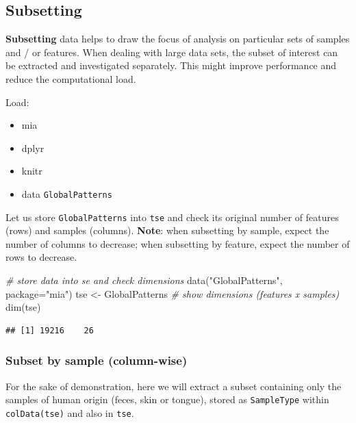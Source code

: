 \documentclass[
]{book}
\newenvironment{Shaded}{\begin{snugshade}}{\end{snugshade}}
\newcommand{\AttributeTok}[1]{\textcolor[rgb]{0.77,0.63,0.00}{#1}}
\newcommand{\CommentTok}[1]{\textcolor[rgb]{0.56,0.35,0.01}{\textit{#1}}}
\newcommand{\FunctionTok}[1]{\textcolor[rgb]{0.00,0.00,0.00}{#1}}
\newcommand{\NormalTok}[1]{#1}
\newcommand{\OtherTok}[1]{\textcolor[rgb]{0.56,0.35,0.01}{#1}}
\newcommand{\StringTok}[1]{\textcolor[rgb]{0.31,0.60,0.02}{#1}}
\providecommand{\tightlist}{%
  \setlength{\itemsep}{0pt}\setlength{\parskip}{0pt}}
\begin{document}
\hypertarget{subsetting}{%
\subsection{Subsetting}\label{subsetting}}

\textbf{Subsetting} data helps to draw the focus of analysis on particular
sets of samples and / or features. When dealing with large data
sets, the subset of interest can be extracted and investigated
separately. This might improve performance and reduce the
computational load.

Load:

\begin{itemize}
\tightlist
\item
  mia
\item
  dplyr
\item
  knitr
\item
  data \texttt{GlobalPatterns}
\end{itemize}

Let us store \texttt{GlobalPatterns} into \texttt{tse} and check its original number of features (rows) and samples (columns). \textbf{Note}: when subsetting by sample, expect the number of columns to decrease; when subsetting by feature, expect the number of rows to decrease.

\begin{Shaded}
\begin{Highlighting}[]
\CommentTok{\# store data into se and check dimensions}
\FunctionTok{data}\NormalTok{(}\StringTok{"GlobalPatterns"}\NormalTok{, }\AttributeTok{package=}\StringTok{"mia"}\NormalTok{)}
\NormalTok{tse }\OtherTok{\textless{}{-}}\NormalTok{ GlobalPatterns}
\CommentTok{\# show dimensions (features x samples)}
\FunctionTok{dim}\NormalTok{(tse) }
\end{Highlighting}
\end{Shaded}

\begin{verbatim}
## [1] 19216    26
\end{verbatim}

\hypertarget{subset-by-sample-column-wise}{%
\subsubsection{Subset by sample (column-wise)}\label{subset-by-sample-column-wise}}

For the sake of demonstration, here we will extract a subset containing only the samples of human origin (feces, skin or tongue), stored as \texttt{SampleType} within \texttt{colData(tse)} and also in \texttt{tse}.
\end{document}
